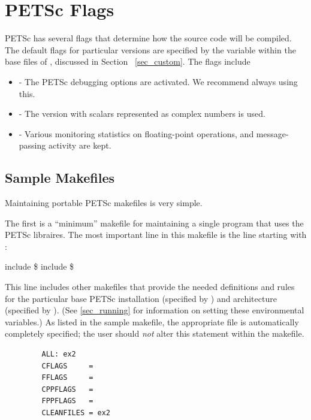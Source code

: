 {{{\section{PETSc Flags}
\label{sec_makeflags}

PETSc has several flags that determine how the source code will be
compiled.  The default flags for particular versions are specified by
the variable  within the base files of , discussed in Section
~\ref{sec_custom}.  The flags include
\begin{itemize}
\item {} - The PETSc debugging options are activated. We 
      recommend always using this. 
\item {} - The version with scalars represented 
      as complex numbers is used. 
\item {} - Various monitoring statistics on floating-point operations,
      and message-passing activity are kept. 
\end{itemize}

\subsection{Sample Makefiles}

Maintaining portable PETSc makefiles is very simple.

The first is a ``minimum'' makefile for maintaining
a single program that uses the PETSc libraires.
The most important line in this makefile is the line starting with :
\begin{tabbing}
   include  \$
   include \$
\end{tabbing}
This line includes other makefiles that provide the needed definitions
and rules for the particular base PETSc installation (specified by
) and architecture (specified by
).  (See \ref{sec_running} for information on
setting these environmental variables.)  As listed in the sample
makefile, the appropriate  file is automatically
completely specified; the user should {\em not} alter this statement
within the makefile.

\begin{figure}[H]
{\small
\begin{verbatim}
   ALL: ex2
   CFLAGS     =
   FFLAGS     =
   CPPFLAGS   =
   FPPFLAGS   =
   CLEANFILES = ex2


\end{verbatim}}
\end{figure}}}}
